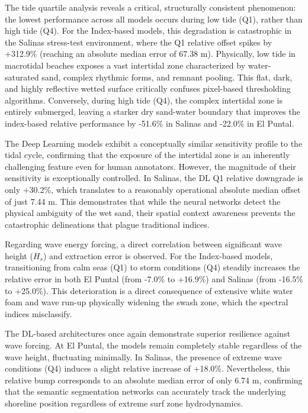 ﻿\documentclass[ENG]{TFUOC}%
\begin{document}
The tide quartile analysis reveals a critical, structurally consistent phenomenon: the lowest performance across all models occurs during low tide (Q1), rather than high tide (Q4). For the Index-based models, this degradation is catastrophic in the Salinas stress-test environment, where the Q1 relative offset spikes by +312.9\% (reaching an absolute median error of 67.38 m). Physically, low tide in macrotidal beaches exposes a vast intertidal zone characterized by water-saturated sand, complex rhythmic forms, and remnant pooling. This flat, dark, and highly reflective wetted surface critically confuses pixel-based thresholding algorithms. Conversely, during high tide (Q4), the complex intertidal zone is entirely submerged, leaving a starker dry sand-water boundary that improves the index-based relative performance by -51.6\% in Salinas and -22.0\% in El Puntal.

The Deep Learning models exhibit a conceptually similar sensitivity profile to the tidal cycle, confirming that the exposure of the intertidal zone is an inherently challenging feature even for human annotators. However, the magnitude of their sensitivity is exceptionally controlled. In Salinas, the DL Q1 relative downgrade is only +30.2\%, which translates to a reasonably operational absolute median offset of just 7.44 m. This demonstrates that while the neural networks detect the physical ambiguity of the wet sand, their spatial context awareness prevents the catastrophic delineations that plague traditional indices.

Regarding wave energy forcing, a direct correlation between significant wave height ($H_s$) and extraction error is observed. For the Index-based models, transitioning from calm seas (Q1) to storm conditions (Q4) steadily increases the relative error in both El Puntal (from -7.0\% to +16.9\%) and Salinas (from -16.5\% to +25.0\%). This deterioration is a direct consequence of extensive white water foam and wave run-up physically widening the swash zone, which the spectral indices misclassify. 

The DL-based architectures once again demonstrate superior resilience against wave forcing. At El Puntal, the models remain completely stable regardless of the wave height, fluctuating minimally. In Salinas, the presence of extreme wave conditions (Q4) induces a slight relative increase of +18.0\%. Nevertheless, this relative bump corresponds to an absolute median error of only 6.74 m, confirming that the semantic segmentation networks can accurately track the underlying shoreline position regardless of extreme surf zone hydrodynamics.
\end{document}
